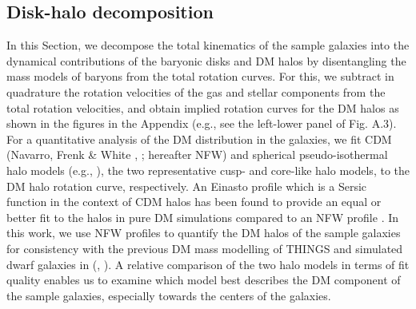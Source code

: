 \documentclass[natbib209]{emulateapj}
\begin{document}
\subsection{Disk\--halo decomposition} \label{DISK_HALO_DECOMPOSITION}
In this Section, we decompose the total kinematics of the sample galaxies into
the dynamical contributions of the baryonic disks and DM halos by
disentangling the mass models of baryons from the total rotation curves. For
this, we subtract in quadrature the rotation velocities of the gas and stellar
components from the total rotation velocities, and obtain implied rotation
curves for the DM halos as shown in the figures in the Appendix
(e.g., see the left-lower panel of Fig. A.3). For a quantitative analysis of the
DM distribution in the galaxies, we fit CDM (Navarro, Frenk \&
White \citeyear{NFW_1996}, \citeyear{NFW_1997}; hereafter NFW) and
spherical pseudo-isothermal halo models (e.g., \citeauthor{Begeman_1991}
\citeyear{Begeman_1991}), the two representative cusp- and core-like halo
models, to the DM halo rotation curve, respectively. 
An Einasto profile which is a Sersic function in the context of CDM halos has
been found to provide an equal or better fit to the halos in pure DM simulations
compared to an NFW profile \cite{2004MNRAS.349.1039N}. In this
work, we use NFW profiles to quantify the DM halos of the sample galaxies for
consistency with the previous DM mass modelling of THINGS and simulated dwarf
galaxies in \citeauthor{Oh_2011a} (\citeyear{Oh_2011b}, \citeyear{Oh_2011a}).
A relative comparison of the two halo models in terms of fit quality enables us
to examine which model best describes the DM component of the sample galaxies,
especially towards the centers of the galaxies.
\end{document}
